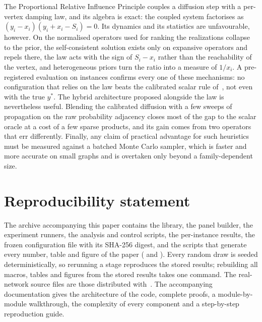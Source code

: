\documentclass[11pt,a4paper]{article}
\theoremstyle{definition}
\theoremstyle{plain}
\begin{document}
The Proportional Relative Influence Principle couples a diffusion step with a per-vertex damping law, and its algebra is exact: the coupled system factorises as $(y_i-x_i)(y_i+x_i-S_i)=0$. Its dynamics and its statistics are unfavourable, however. On the normalised operators used for ranking the realizations collapse to the prior, the self-consistent solution exists only on expansive operators and repels there, the law acts with the sign of $S_i-x_i$ rather than the reachability of the vertex, and heterogeneous priors turn the ratio into a measure of $1/x_i$. A pre-registered evaluation on \NTotal{} instances confirms every one of these mechanisms: no configuration that relies on the law beats the calibrated scalar rule of~\cite{konstantellos26}, not even with the true $y^*$. The hybrid architecture proposed alongside the law is nevertheless useful. Blending the calibrated diffusion with a few sweeps of propagation on the raw probability adjacency closes most of the gap to the scalar oracle at a cost of a few sparse products, and its gain comes from two operators that err differently. Finally, any claim of practical advantage for such heuristics must be measured against a batched Monte Carlo sampler, which is faster and more accurate on small graphs and is overtaken only beyond a family-dependent size.

\section*{Reproducibility statement}

The archive accompanying this paper contains the library, the panel builder, the experiment runners, the analysis and control scripts, the per-instance results, the frozen configuration file with its SHA-256 digest, and the scripts that generate every number, table and figure of the paper ( and ). Every random draw is seeded deterministically, so rerunning a stage reproduces the stored results; rebuilding all macros, tables and figures from the stored results takes one command. The real-network source files are those distributed with~\cite{shchur18}. The accompanying documentation gives the architecture of the code, complete proofs, a module-by-module walkthrough, the complexity of every component and a step-by-step reproduction guide.
\end{document}
